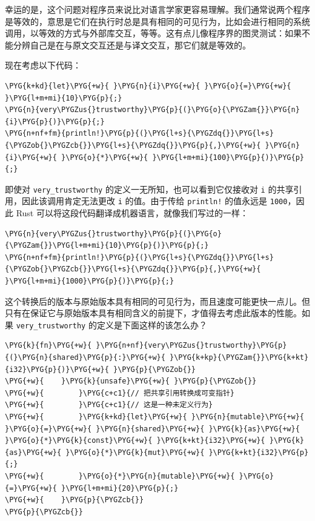 幸运的是，这个问题对程序员来说比对语言学家更容易理解。我们通常说两个程序是等效的，意思是它们在执行时总是具有相同的可见行为，比如会进行相同的系统调用，以等效的方式与外部库交互，等等。这有点儿像程序界的图灵测试：如果不能分辨自己是在与原文交互还是与译文交互，那它们就是等效的。

现在考虑以下代码：

\begin{Verbatim}[commandchars=\\\{\},breaklines=true,breakanywhere=true,fontsize=\codefont,xleftmargin=17bp]
\PYG{k+kd}{let}\PYG{+w}{ }\PYG{n}{i}\PYG{+w}{ }\PYG{o}{=}\PYG{+w}{ }\PYG{l+m+mi}{10}\PYG{p}{;}
\PYG{n}{very\PYGZus{}trustworthy}\PYG{p}{(}\PYG{o}{\PYGZam{}}\PYG{n}{i}\PYG{p}{)}\PYG{p}{;}
\PYG{n+nf+fm}{println!}\PYG{p}{(}\PYG{l+s}{\PYGZdq{}}\PYG{l+s}{\PYGZob{}\PYGZcb{}}\PYG{l+s}{\PYGZdq{}}\PYG{p}{,}\PYG{+w}{ }\PYG{n}{i}\PYG{+w}{ }\PYG{o}{*}\PYG{+w}{ }\PYG{l+m+mi}{100}\PYG{p}{)}\PYG{p}{;}
\end{Verbatim}

即使对 \texttt{very\_trustworthy} 的定义一无所知，也可以看到它仅接收对 \texttt{i} 的共享引用，因此该调用肯定无法更改 \texttt{i} 的值。由于传给 \texttt{println!} 的值永远是 \texttt{1000}，因此 Rust 可以将这段代码翻译成机器语言，就像我们写过的一样：

\begin{Verbatim}[commandchars=\\\{\},breaklines=true,breakanywhere=true,fontsize=\codefont,xleftmargin=17bp]
\PYG{n}{very\PYGZus{}trustworthy}\PYG{p}{(}\PYG{o}{\PYGZam{}}\PYG{l+m+mi}{10}\PYG{p}{)}\PYG{p}{;}
\PYG{n+nf+fm}{println!}\PYG{p}{(}\PYG{l+s}{\PYGZdq{}}\PYG{l+s}{\PYGZob{}\PYGZcb{}}\PYG{l+s}{\PYGZdq{}}\PYG{p}{,}\PYG{+w}{ }\PYG{l+m+mi}{1000}\PYG{p}{)}\PYG{p}{;}
\end{Verbatim}

这个转换后的版本与原始版本具有相同的可见行为，而且速度可能更快一点儿。但只有在保证它与原始版本具有相同含义的前提下，才值得去考虑此版本的性能。如果 \texttt{very\_trustworthy} 的定义是下面这样的该怎么办？

\begin{Verbatim}[commandchars=\\\{\},breaklines=true,breakanywhere=true,fontsize=\codefont,xleftmargin=17bp]
\PYG{k}{fn}\PYG{+w}{ }\PYG{n+nf}{very\PYGZus{}trustworthy}\PYG{p}{(}\PYG{n}{shared}\PYG{p}{:}\PYG{+w}{ }\PYG{k+kp}{\PYGZam{}}\PYG{k+kt}{i32}\PYG{p}{)}\PYG{+w}{ }\PYG{p}{\PYGZob{}}
\PYG{+w}{    }\PYG{k}{unsafe}\PYG{+w}{ }\PYG{p}{\PYGZob{}}
\PYG{+w}{        }\PYG{c+c1}{// 把共享引用转换成可变指针}
\PYG{+w}{        }\PYG{c+c1}{// 这是一种未定义行为}
\PYG{+w}{        }\PYG{k+kd}{let}\PYG{+w}{ }\PYG{n}{mutable}\PYG{+w}{ }\PYG{o}{=}\PYG{+w}{ }\PYG{n}{shared}\PYG{+w}{ }\PYG{k}{as}\PYG{+w}{ }\PYG{o}{*}\PYG{k}{const}\PYG{+w}{ }\PYG{k+kt}{i32}\PYG{+w}{ }\PYG{k}{as}\PYG{+w}{ }\PYG{o}{*}\PYG{k}{mut}\PYG{+w}{ }\PYG{k+kt}{i32}\PYG{p}{;}
\PYG{+w}{        }\PYG{o}{*}\PYG{n}{mutable}\PYG{+w}{ }\PYG{o}{=}\PYG{+w}{ }\PYG{l+m+mi}{20}\PYG{p}{;}
\PYG{+w}{    }\PYG{p}{\PYGZcb{}}
\PYG{p}{\PYGZcb{}}
\end{Verbatim}

